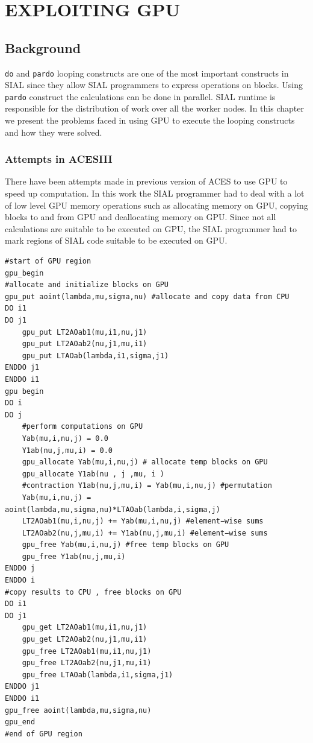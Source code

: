 \chapter{EXPLOITING GPU}\label{exploitinggpu}
\section{Background}
\texttt{do} and \texttt{pardo} looping constructs are one of the most important
constructs in SIAL since they allow SIAL programmers to express operations on
blocks. Using \texttt{pardo} construct the calculations can be done in parallel.
SIAL runtime is responsible for the distribution of work over all the worker nodes.
In this chapter we present the problems faced in using GPU to execute the looping
constructs and how they were solved.

\subsection{Attempts in ACESIII}
There have been attempts\cite{Jindal2016} made in previous version of ACES
to use GPU to speed up computation. In this work the SIAL programmer had to deal
with a lot of low level GPU memory operations such as allocating memory on GPU,
copying blocks to and from GPU and deallocating memory on GPU. Since not all
calculations are suitable to be executed on GPU, the SIAL programmer had to mark
regions of SIAL code suitable to be executed on GPU.

\begin{lstlisting}[caption={Code Fragment from ACESIII for CCSD calculation},
  label={lst:ACESIII_gpucode}]
#start of GPU region
gpu_begin
#allocate and initialize blocks on GPU
gpu_put aoint(lambda,mu,sigma,nu) #allocate and copy data from CPU
DO i1
DO j1
    gpu_put LT2AOab1(mu,i1,nu,j1)
    gpu_put LT2AOab2(nu,j1,mu,i1)
    gpu_put LTAOab(lambda,i1,sigma,j1)
ENDDO j1
ENDDO i1
gpu begin
DO i
DO j
    #perform computations on GPU
    Yab(mu,i,nu,j) = 0.0
    Y1ab(nu,j,mu,i) = 0.0
    gpu_allocate Yab(mu,i,nu,j) # allocate temp blocks on GPU
    gpu_allocate Y1ab(nu , j ,mu, i )
    #contraction Y1ab(nu,j,mu,i) = Yab(mu,i,nu,j) #permutation
    Yab(mu,i,nu,j) = aoint(lambda,mu,sigma,nu)*LTAOab(lambda,i,sigma,j)
    LT2AOab1(mu,i,nu,j) += Yab(mu,i,nu,j) #element−wise sums
    LT2AOab2(nu,j,mu,i) += Y1ab(nu,j,mu,i) #element−wise sums
    gpu_free Yab(mu,i,nu,j) #free temp blocks on GPU
    gpu_free Y1ab(nu,j,mu,i)
ENDDO j
ENDDO i
#copy results to CPU , free blocks on GPU
DO i1
DO j1
    gpu_get LT2AOab1(mu,i1,nu,j1)
    gpu_get LT2AOab2(nu,j1,mu,i1)
    gpu_free LT2AOab1(mu,i1,nu,j1)
    gpu_free LT2AOab2(nu,j1,mu,i1)
    gpu_free LTAOab(lambda,i1,sigma,j1)
ENDDO j1
ENDDO i1
gpu_free aoint(lambda,mu,sigma,nu)
gpu_end
#end of GPU region
\end{lstlisting}


